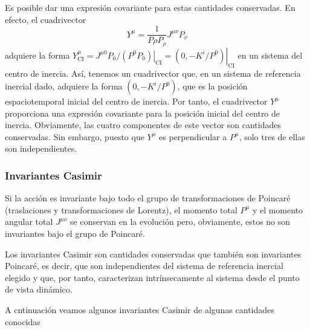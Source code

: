 Es posible dar una expresión covariante para estas cantidades conservadas. En efecto, el cuadrivector
$$
Y^{\mu}=\frac{1}{P \rho P_{\rho}} J^{\mu \nu} P_{\nu}
$$
adquiere la forma $Y_{\mathrm{CI}}^{\mu}=J^{\mu 0} P_{0} /\left.\left(P^{0} P_{0}\right)\right|_{\mathrm{CI}}=\left.\left(0,-K^{i} / P^{0}\right)\right|_{\mathrm{CI}}$ en un sistema del centro de inercia. Así, tenemos un cuadrivector que, en un sistema de referencia inercial dado, adquiere la forma $\left(0,-K^{i} / P^{0}\right)$, que es la posición espaciotemporal inicial del centro de inercia. Por tanto, el cuadrivector $Y^{\mu}$ proporciona una expresión covariante para la posición inicial del centro de inercia. Obviamente, las cuatro componentes de este vector son cantidades conservadas. Sin embargo, puesto que $Y^{\mu}$ es perpendicular a $P^{\mu}$, solo tres de ellas son independientes.
\subsubsection{Invariantes Casimir}
Si la acción es invariante bajo todo el grupo de transformaciones de Poincaré (traslaciones y transformaciones de Lorentz), el momento total $P^{\mu}$ y el momento angular total $J^{\mu \nu}$ se conservan en la evolución pero, obviamente, estos no son
invariantes bajo el grupo de Poincaré.



\begin{definition}



  Los invariantes Casimir son cantidades conservadas que también son invariantes Poincaré, es decir, que son independientes del sistema de referencia inercial elegido y que, por tanto, caracterizan intrínsecamente al sistema desde el punto de vista dinámico.
\end{definition}

A cntinuación veamos algunos invariantes Casimir de algunas cantidades conocidas


